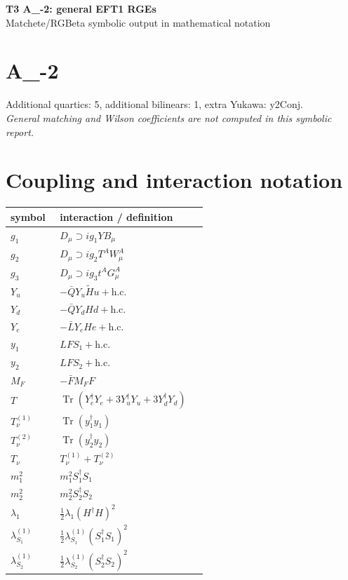 \documentclass[10pt,a4paper]{article}
\begin{document}
\begin{center}
{\Large\bfseries T3 A\_-2: general EFT1 RGEs}\\[4pt]
Matchete/RGBeta symbolic output in mathematical notation
\end{center}
\bigskip
\section*{A\_-2}
Additional quartics: 5, additional bilinears: 1, extra Yukawa: y2Conj.\\
\emph{General matching and Wilson coefficients are not computed in this symbolic report.}
\section*{Coupling and interaction notation}
\begin{longtable}{@{}p{0.23\linewidth}p{0.69\linewidth}@{}}
\toprule
symbol & interaction / definition \\
\midrule
$g_1$ & $D_\mu\supset i g_1YB_\mu$ \\
$g_2$ & $D_\mu\supset i g_2T^AW_\mu^A$ \\
$g_3$ & $D_\mu\supset i g_3t^AG_\mu^A$ \\
$Y_u$ & $-\bar QY_u\widetilde Hu+\mathrm{h.c.}$ \\
$Y_d$ & $-\bar QY_dHd+\mathrm{h.c.}$ \\
$Y_e$ & $-\bar LY_eHe+\mathrm{h.c.}$ \\
$y_1$ & $LFS_1+\mathrm{h.c.}$ \\
$y_2$ & $LFS_2+\mathrm{h.c.}$ \\
$M_F$ & $-\bar FM_FF$ \\
$T$ & $\operatorname{Tr}(Y_e^\dagger Y_e+3Y_u^\dagger Y_u+3Y_d^\dagger Y_d)$ \\
$T_\nu^{(1)}$ & $\operatorname{Tr}(y_1^\dagger y_1)$ \\
$T_\nu^{(2)}$ & $\operatorname{Tr}(y_2^\dagger y_2)$ \\
$T_\nu$ & $T_\nu^{(1)}+T_\nu^{(2)}$ \\
$m_1^2$ & $m_1^2S_1^\dagger S_1$ \\
$m_2^2$ & $m_2^2S_2^\dagger S_2$ \\
$\lambda_1$ & $\frac12\lambda_1(H^\dagger H)^2$ \\
$\lambda_{S_1}^{(1)}$ & $\frac12\lambda_{S_1}^{(1)}(S_1^\dagger S_1)^2$ \\
$\lambda_{S_2}^{(1)}$ & $\frac12\lambda_{S_2}^{(1)}(S_2^\dagger S_2)^2$ \\

\end{longtable}
\end{document}
